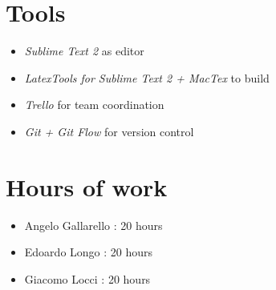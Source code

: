 \newpage
\begin{appendices}
\section{Tools}

\begin{itemize}
	\item \emph{Sublime Text 2} as editor
	\item \emph{LatexTools for Sublime Text 2 + MacTex}  to build
	\item \emph{Trello} for team coordination 
	\item \emph{Git + Git Flow} for version control 
\end{itemize}

\section{Hours of work}

\begin{itemize}
	\item Angelo Gallarello : 20 hours
	\item Edoardo Longo : 20 hours
	\item Giacomo Locci : 20 hours
\end{itemize}

\end{appendices}